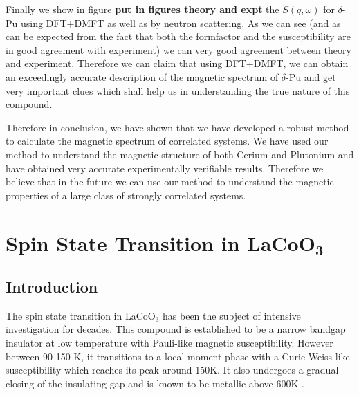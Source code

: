 \documentclass[10pt]{ruthesis}
\begin{document}
{Finally we show in figure \textbf{put in figures theory and expt} the $S(q,\omega)$ for $\delta$-Pu using DFT+DMFT as well as by neutron scattering. As we can see (and as can be expected from the fact that both the formfactor and the susceptibility are in good agreement with experiment) we can very good agreement between theory and experiment. Therefore we can claim that using DFT+DMFT, we can obtain an exceedingly accurate description of the magnetic spectrum of $\delta$-Pu and get very important clues which shall help us in understanding the true nature of this compound.

Therefore in conclusion, we have shown that we have developed a robust method to calculate the magnetic spectrum of correlated systems. We have used our method to understand the magnetic structure of both Cerium and Plutonium and have obtained very accurate experimentally verifiable results. Therefore we believe that in the future we can use our method to understand the magnetic properties of a large class of strongly correlated systems.


\pagebreak
\chapter{Spin State Transition in $\mathbf{LaCoO_3}$}

\section{Introduction}
The spin state transition in LaCoO$_3$ has been the subject of  intensive investigation for decades.\cite{Heikes, Naiman, Goodenough} This compound is established to be a narrow bandgap insulator at low temperature with Pauli-like magnetic susceptibility. However between 90-150 K, it transitions to a local moment phase with a Curie-Weiss like susceptibility which reaches its peak around 150K. It also undergoes a gradual closing of the insulating gap and is known to be metallic above 600K \cite{BhideMoss, English, Saitoh}.

}
\end{document}
